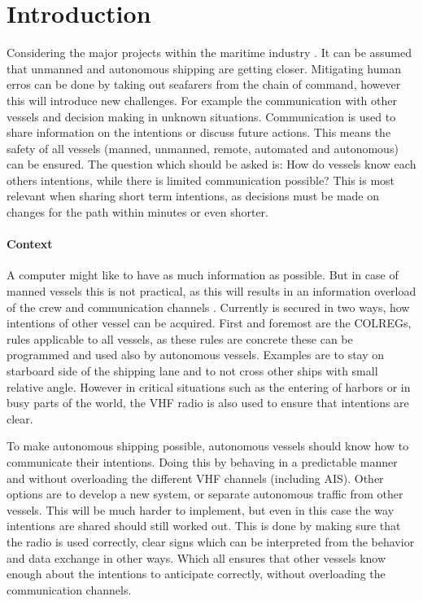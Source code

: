 \chapter*{Introduction}
\label{sec:introduction}

Considering the major projects within the maritime industry \cite{SMASH2017} \cite{Eriksen2017} \cite{MUNIN2016} \cite{Sames2017} \cite{RollsRoyce2015} \cite{Waterborne2016}. It can be assumed that unmanned and autonomous shipping are getting closer. Mitigating human erros can be done by taking out seafarers from the chain of command, however this will introduce new challenges. For example the communication with other vessels and decision making in unknown situations. Communication is used to share information on the intentions or discuss future actions. This means the safety of all vessels (manned, unmanned, remote, automated and autonomous) can be ensured. The question which should be asked is: How do vessels know each others intentions, while there is limited communication possible? This is most relevant when sharing short term intentions, as decisions must be made on changes for the path within minutes or even shorter.

\subsubsection*{Context}
A computer might like to have as much information as possible. But in case of manned vessels this is not practical, as this will results in an information overload of the crew and communication channels \cite{CCNR2017}. Currently is secured in two ways, how intentions of other vessel can be acquired. First and foremost are the \ac{COLREGs}\cite{IMO1972}, rules applicable to all vessels, as these rules are concrete these can be programmed and used also by autonomous vessels. Examples are to stay on starboard side of the shipping lane and to not cross other ships with small relative angle. However in critical situations such as the entering of harbors or in busy parts of the world, the VHF radio is also used to ensure that intentions are clear.

To make autonomous shipping possible, autonomous vessels should know how to communicate their intentions. Doing this by behaving in a predictable manner and without overloading the different VHF channels (including AIS). Other options are to develop a new system, or separate autonomous traffic from other vessels. This will be much harder to implement, but even in this case the way intentions are shared should still worked out. This is done by making sure that the radio is used correctly, clear signs which can be interpreted from the behavior and data exchange in other ways. Which all ensures that other vessels know enough about the intentions to anticipate correctly, without overloading the communication channels.

